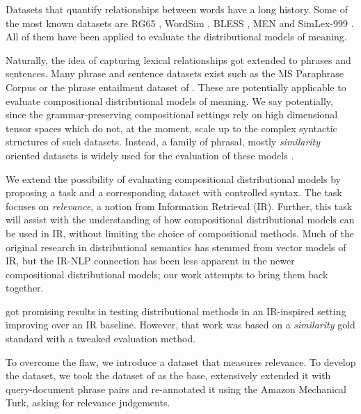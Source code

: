 
Datasets that quantify relationships between words have a long history. Some of the most known datasets are RG65 \cite{Rubenstein:1965:CCS:365628.365657}, WordSim \cite{2002:PSC:503104.503110}, BLESS \cite{baroni-lenci:2011:GEMS}, MEN \cite{Bruni:2014:MDS:2655713.2655714} and SimLex-999 \cite{hill2014simlex}. All of them have been applied to evaluate the distributional models of meaning.

Naturally, the idea of capturing lexical relationships got extended to phrases and sentences. Many phrase and sentence datasets exist such as the MS Paraphrase Corpus \cite{dolan2005par} or the phrase entailment dataset of . These are potentially applicable to evaluate compositional distributional models of meaning. We say potentially, since the grammar-preserving compositional settings \cite{baroni2014frege,DBLP:journals/corr/abs-1003-4394}  rely on high dimensional tensor spaces which do not, at the moment, scale up to  the complex syntactic structures of such datasets. Instead, a family of phrasal, mostly \emph{similarity} oriented datasets \cite{mitchell-lapata:2008:ACLMain,Grefenstette:2011:ESC:2145432.2145580,kartsaklis-sadrzadeh:2013:EMNLP,kartsadrqpl2014} is widely used for the evaluation of these models \cite{milajevs-EtAl:2014:EMNLP2014,kim-demarneffe-foslerlussier:2015:VSM-NLP}.

We extend the possibility of evaluating compositional distributional models by proposing a task and a corresponding dataset  with controlled syntax. The task focuses on \emph{relevance}, a notion from Information Retrieval (IR).  Further, this task will assist with the understanding of how compositional distributional  models  can be used in IR, without limiting the choice of compositional methods. Much of the original research in distributional semantics has stemmed from vector models of IR, but the IR-NLP connection has been less apparent in  the newer compositional distributional models; our work attempts to bring them back together.


 got promising results in testing distributional methods in an IR-inspired setting improving over an IR baseline. However, that work was based on a \emph{similarity} gold standard with a tweaked evaluation method.

To overcome the flaw, we introduce a dataset that measures relevance. To develop the dataset, we took the  dataset of  as the base, extensively extended it with query-document phrase pairs and re-annotated it using the Amazon Mechanical Turk, asking for relevance judgements.

